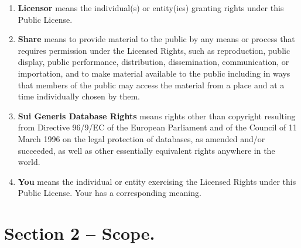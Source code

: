\begin{enumerate}[label=\alph*.]
  \item \textbf{Licensor} means the individual(s) or entity(ies) granting rights under this Public License.

  \item \textbf{Share} means to provide material to the public by any means or process that requires permission under the Licensed Rights, such as reproduction, public display, public performance, distribution, dissemination, communication, or importation, and to make material available to the public including in ways that members of the public may access the material from a place and at a time individually chosen by them.

  \item \textbf{Sui Generis Database Rights} means rights other than copyright resulting from Directive 96/9/EC of the European Parliament and of the Council of 11 March 1996 on the legal protection of databases, as amended and/or succeeded, as well as other essentially equivalent rights anywhere in the world.

  \item \textbf{You} means the individual or entity exercising the Licensed Rights under this Public License. Your has a corresponding meaning.
\end{enumerate}

\section{Section 2 – Scope.}
\label{section2}

